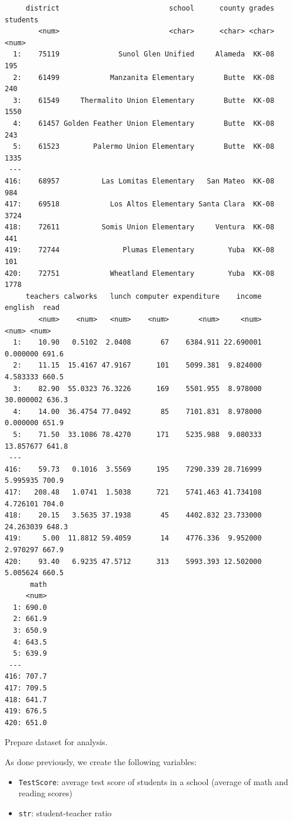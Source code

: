 \documentclass[
  12pt,
  letterpaper,
]{scrbook}
\providecommand{\tightlist}{%
  \setlength{\itemsep}{0pt}\setlength{\parskip}{0pt}}
\renewcommand{\tightlist}{\setlength{\itemsep}{0.5\baselineskip}\setlength{\parskip}{0.2\baselineskip}}
\theoremstyle{plain}
\theoremstyle{definition}
\theoremstyle{remark}
\begin{document}
\begin{verbatim}
     district                          school      county grades students
        <num>                          <char>      <char> <char>    <num>
  1:    75119              Sunol Glen Unified     Alameda  KK-08      195
  2:    61499            Manzanita Elementary       Butte  KK-08      240
  3:    61549     Thermalito Union Elementary       Butte  KK-08     1550
  4:    61457 Golden Feather Union Elementary       Butte  KK-08      243
  5:    61523        Palermo Union Elementary       Butte  KK-08     1335
 ---                                                                     
416:    68957          Las Lomitas Elementary   San Mateo  KK-08      984
417:    69518            Los Altos Elementary Santa Clara  KK-08     3724
418:    72611          Somis Union Elementary     Ventura  KK-08      441
419:    72744               Plumas Elementary        Yuba  KK-08      101
420:    72751            Wheatland Elementary        Yuba  KK-08     1778
     teachers calworks   lunch computer expenditure    income   english  read
        <num>    <num>   <num>    <num>       <num>     <num>     <num> <num>
  1:    10.90   0.5102  2.0408       67    6384.911 22.690001  0.000000 691.6
  2:    11.15  15.4167 47.9167      101    5099.381  9.824000  4.583333 660.5
  3:    82.90  55.0323 76.3226      169    5501.955  8.978000 30.000002 636.3
  4:    14.00  36.4754 77.0492       85    7101.831  8.978000  0.000000 651.9
  5:    71.50  33.1086 78.4270      171    5235.988  9.080333 13.857677 641.8
 ---                                                                         
416:    59.73   0.1016  3.5569      195    7290.339 28.716999  5.995935 700.9
417:   208.48   1.0741  1.5038      721    5741.463 41.734108  4.726101 704.0
418:    20.15   3.5635 37.1938       45    4402.832 23.733000 24.263039 648.3
419:     5.00  11.8812 59.4059       14    4776.336  9.952000  2.970297 667.9
420:    93.40   6.9235 47.5712      313    5993.393 12.502000  5.005624 660.5
      math
     <num>
  1: 690.0
  2: 661.9
  3: 650.9
  4: 643.5
  5: 639.9
 ---      
416: 707.7
417: 709.5
418: 641.7
419: 676.5
420: 651.0
\end{verbatim}

Prepare dataset for analysis.

As done previously, we create the following variables:

\begin{itemize}
\tightlist
\item
  \texttt{TestScore}: average test score of students in a school
  (average of math and reading scores)
\item
  \texttt{str}: student-teacher ratio
\end{itemize}
\end{document}
